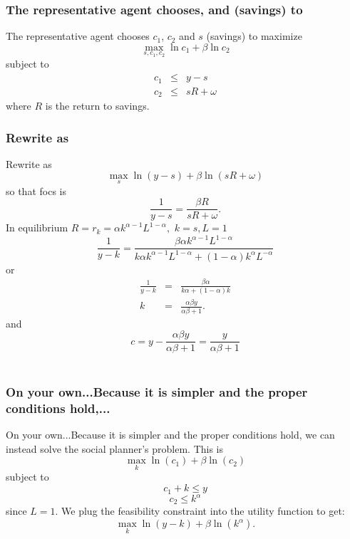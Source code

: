 \documentclass[aspectratio=169]{ltx-talk}
\begin{document}
\begin{frame}
\frametitle{The representative agent chooses, and (savings) to}
The representative agent chooses $c_{1}$, $c_{2}$ and $s$ (savings) to
maximize 
\begin{equation*}
\underset{s,c_{1},c_{2}}{\max }\ln c_{1}+\beta \ln c_{2}
\end{equation*}%
subject to 
\begin{eqnarray*}
c_{1} &\leq &y-s \\
c_{2} &\leq &sR+\omega
\end{eqnarray*}%
where $R$ is the return to savings.
\end{frame}

\begin{frame}
\frametitle{Rewrite as}
Rewrite as%
\begin{equation*}
\underset{s}{\max }\ln \left( y-s\right) +\beta \ln \left( sR+\omega \right) 
\end{equation*}%
so that focs is%
\begin{equation*}
\frac{1}{y-s}=\frac{\beta R}{sR+\omega }.
\end{equation*}%
In equilibrium $R=r_{k}=\alpha k^{\alpha -1}L^{1-\alpha },$ $k=s,L=1$ 
\begin{equation*}
\frac{1}{y-k}=\frac{\beta \alpha k^{\alpha -1}L^{1-\alpha }}{k\alpha
k^{\alpha -1}L^{1-\alpha }+\left( 1-\alpha \right) k^{\alpha }L^{-\alpha }}
\end{equation*}%
or 
\begin{eqnarray*}
\frac{1}{y-k} &=&\frac{\beta \alpha }{k\alpha +\left( 1-\alpha \right) k} \\
k &=&\frac{\alpha \beta y}{\alpha \beta +1}.
\end{eqnarray*}%
and 
\begin{equation*}
c=y-\frac{\alpha \beta y}{\alpha \beta +1}=\frac{y}{\alpha \beta +1}
\end{equation*}
$\allowbreak $
\end{frame}

\begin{frame}
\frametitle{On your own...Because it is simpler and the proper conditions hold,...}
On your own...Because it is simpler and the proper conditions hold, we can
instead solve the social planner's problem. This is 
\begin{equation*}
\underset{k}{\max }\ln \left( c_{1}\right) +\beta \ln \left( c_{2}\right)
\end{equation*}%
subject to%
\begin{equation*}
c_{1}+k\leq y
\end{equation*}%
\begin{equation*}
c_{2}\leq k^{\alpha }
\end{equation*}%
since $L=1.$ We plug the feasibility constraint into the utility function to
get: 
\begin{equation*}
\underset{k}{\max }\ln \left( y-k\right) +\beta \ln \left( k^{\alpha
}\right) .
\end{equation*}
\end{frame}
\end{document}
